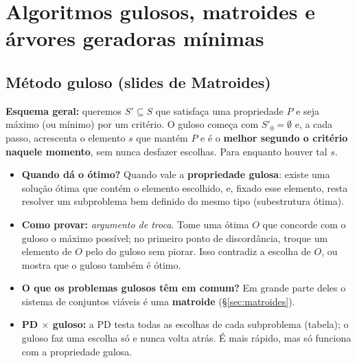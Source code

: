 \section{Algoritmos gulosos, matroides e árvores geradoras mínimas}\label{sec:gulosos}

\subsection{Método guloso (slides de Matroides)}\label{sec:guloso}
\textbf{Esquema geral:} queremos $S'\subseteq S$ que satisfaça uma propriedade $P$ e seja máximo (ou mínimo) por um critério. O guloso começa com $S'_0=\emptyset$ e, a cada passo, acrescenta o elemento $s$ que mantém $P$ e é o \textbf{melhor segundo o critério naquele momento}, sem nunca desfazer escolhas. Para enquanto houver tal $s$.
\begin{itemize}
  \item \textbf{Quando dá o ótimo?} Quando vale a \textbf{propriedade gulosa}: existe uma solução ótima que contém o elemento escolhido, e, fixado esse elemento, resta resolver um subproblema bem definido do mesmo tipo (subestrutura ótima).
  \item \textbf{Como provar:} \emph{argumento de troca}. Tome uma ótima $O$ que concorde com o guloso o máximo possível; no primeiro ponto de discordância, troque um elemento de $O$ pelo do guloso sem piorar. Isso contradiz a escolha de $O$, ou mostra que o guloso também é ótimo.
  \item \textbf{O que os problemas gulosos têm em comum?} Em grande parte deles o sistema de conjuntos viáveis é uma \textbf{matroide} (§\ref{sec:matroides}).
  \item \textbf{PD $\times$ guloso:} a PD testa todas as escolhas de cada subproblema (tabela); o guloso faz uma escolha só e nunca volta atrás. É mais rápido, mas só funciona com a propriedade gulosa.
\end{itemize}

